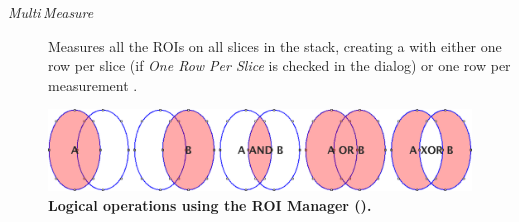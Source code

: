 \begin{minipage}[c][1\totalheight][t]{0.653\columnwidth}%
\begin{description}
\item [{\emph{Multi\,Measure}}] Measures all the ROIs on all slices in
the stack, creating a  with either one
row per slice (if \emph{One Row Per Slice} is checked in the dialog)
or one row per measurement \cite{C-RM-MultiMeasure}.\end{description}
%
\end{minipage}

\begin{figure}[h]
\noindent \includegraphics[width=1\columnwidth]{images/ROIoperators}

\noindent \caption{\textbf{Logical operations using the ROI Manager (\protect{}).}}
\end{figure}

